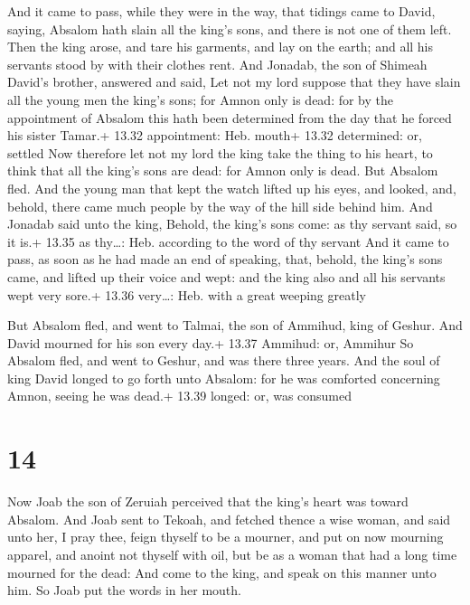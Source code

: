  And it came to pass, while they were in the way, that
tidings came to David, saying, Absalom hath slain all the king's sons,
and there is not one of them left.  Then the king arose,
and tare his garments, and lay on the earth; and all his servants stood
by with their clothes rent.  And Jonadab, the son of
Shimeah David's brother, answered and said, Let not my lord suppose that
they have slain all the young men the king's sons; for Amnon only is
dead: for by the appointment of Absalom this hath been determined from
the day that he forced his sister Tamar.+ 13.32 appointment: Heb. mouth+
13.32 determined: or, settled  Now therefore let not my
lord the king take the thing to his heart, to think that all the king's
sons are dead: for Amnon only is dead.  But Absalom fled.
And the young man that kept the watch lifted up his eyes, and looked,
and, behold, there came much people by the way of the hill side behind
him.  And Jonadab said unto the king, Behold, the king's
sons come: as thy servant said, so it is.+ 13.35 as thy\ldots: Heb.
according to the word of thy servant  And it came to pass,
as soon as he had made an end of speaking, that, behold, the king's sons
came, and lifted up their voice and wept: and the king also and all his
servants wept very sore.+ 13.36 very\ldots: Heb. with a great weeping
greatly

 But Absalom fled, and went to Talmai, the son of
Ammihud, king of Geshur. And David mourned for his son every day.+ 13.37
Ammihud: or, Ammihur  So Absalom fled, and went to Geshur,
and was there three years.  And the soul of king David
longed to go forth unto Absalom: for he was comforted concerning Amnon,
seeing he was dead.+ 13.39 longed: or, was consumed

\hypertarget{section-13}{%
\section{14}\label{section-13}}

 Now Joab the son of Zeruiah perceived that the king's heart
was toward Absalom.  And Joab sent to Tekoah, and fetched
thence a wise woman, and said unto her, I pray thee, feign thyself to be
a mourner, and put on now mourning apparel, and anoint not thyself with
oil, but be as a woman that had a long time mourned for the dead:
 And come to the king, and speak on this manner unto him. So
Joab put the words in her mouth.

